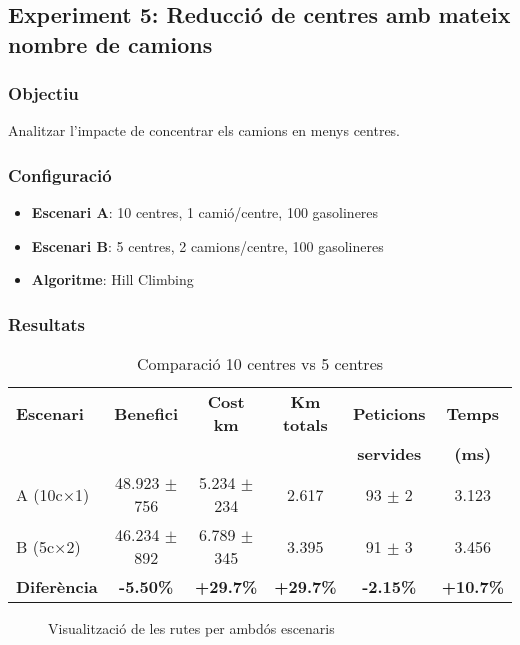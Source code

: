 \subsection{Experiment 5: Reducció de centres amb mateix nombre de camions}

\subsubsection{Objectiu}
Analitzar l'impacte de concentrar els camions en menys centres.

\subsubsection{Configuració}
\begin{itemize}
    \item \textbf{Escenari A}: 10 centres, 1 camió/centre, 100 gasolineres
    \item \textbf{Escenari B}: 5 centres, 2 camions/centre, 100 gasolineres
    \item \textbf{Algoritme}: Hill Climbing
\end{itemize}

\subsubsection{Resultats}

\begin{table}[H]
\centering
\begin{tabular}{@{}lccccc@{}}
\toprule
\textbf{Escenari} & \textbf{Benefici} & \textbf{Cost km} & \textbf{Km totals} & \textbf{Peticions} & \textbf{Temps} \\
 & & & & \textbf{servides} & \textbf{(ms)} \\
\midrule
A (10c×1) & 48.923 $\pm$ 756 & 5.234 $\pm$ 234 & 2.617 & 93 $\pm$ 2 & 3.123 \\
B (5c×2) & 46.234 $\pm$ 892 & 6.789 $\pm$ 345 & 3.395 & 91 $\pm$ 3 & 3.456 \\
\textbf{Diferència} & \textbf{-5.50\%} & \textbf{+29.7\%} & \textbf{+29.7\%} & \textbf{-2.15\%} & \textbf{+10.7\%} \\
\bottomrule
\end{tabular}
\caption{Comparació 10 centres vs 5 centres}
\label{tab:exp5-centres}
\end{table}

\begin{figure}[H]
\centering
\caption{Visualització de les rutes per ambdós escenaris}
\label{fig:exp5-mapa}
\end{figure}

